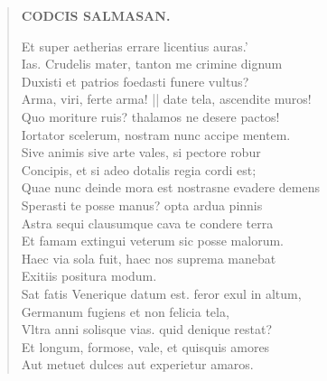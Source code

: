 \documentclass[11pt, a4paper]{report}
\begin{document}
\begin{verse}
    \begin{center} \textbf{CODCIS SALMASAN.} \end{center} \marginpar{[79]} Et super aetherias errare licentius auras.’ \\ Ias. Crudelis mater, tanton me crimine dignum \\ Duxisti et patrios foedasti funere vultus? \\ Arma, viri, ferte arma! || date tela, ascendite muros! \\ Quo moriture ruis? thalamos ne desere pactos! \\ Iortator scelerum, nostram nunc accipe mentem. \\ Sive animis sive arte vales,  \lbrack si pectore robur \\ Concipis, \rbrack  et si adeo dotalis regia cordi est; \\  \lbrack Quae nunc deinde mora est \rbrack  nostrasne evadere demens \\ Sperasti te posse manus? opta ardua pinnis \\ Astra sequi clausumque cava te condere terra \\ Et famam extingui veterum sic posse malorum. \\ Haec via sola fuit, haec nos suprema manebat \\ Exitiis positura modum. \\ Sat fatis Venerique datum est. feror exul in altum, \\ Germanum fugiens et non felicia tela, \\ Vltra anni solisque vias. quid denique restat? \\ Et longum, formose, vale, et quisquis amores \\ Aut metuet dulces aut experietur amaros. \\ 
      \end{verse}
  
\end{document}
